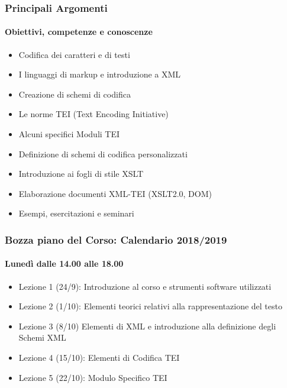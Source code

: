 \begin{frame}
    \frametitle{Principali Argomenti}
    \framesubtitle{Obiettivi, competenze e conoscenze}
    \addtocounter{nframe}{1}

    
        \begin{itemize}
            \item Codifica dei caratteri e di testi
            \item I linguaggi di markup e introduzione a XML
            \item Creazione di schemi di codifica
            \item Le norme TEI (Text Encoding Initiative)
            \item Alcuni specifici Moduli TEI
            \item Definizione di schemi di codifica personalizzati
            \item Introduzione ai fogli di stile XSLT
            \item Elaborazione documenti XML-TEI (XSLT2.0, DOM)
            \item Esempi, esercitazioni e seminari 
        \end{itemize}

\end{frame}

\begin{frame}
    \frametitle{Bozza piano del Corso: Calendario 2018/2019}
    \framesubtitle{Lunedì dalle 14.00 alle 18.00}
    \addtocounter{nframe}{1}
    
        \begin{itemize}
            \setlength\itemsep{0.5em}
            \item Lezione 1 (24/9): Introduzione al corso e strumenti software utilizzati
            \item Lezione 2 (1/10): Elementi teorici relativi alla rappresentazione del testo
            \item Lezione 3 (8/10) Elementi di XML e introduzione alla definizione degli Schemi XML
            \item Lezione 4 (15/10): Elementi di Codifica TEI
            \item Lezione 5 (22/10): Modulo Specifico TEI
        \end{itemize}

\end{frame}

